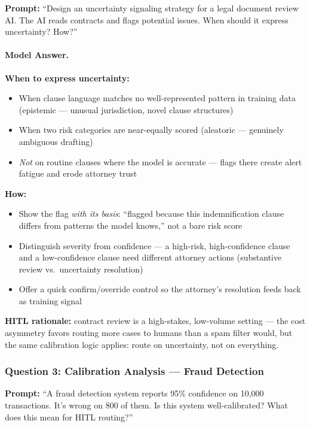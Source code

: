 \textbf{Prompt:} ``Design an uncertainty signaling strategy for a legal document review AI. The AI reads contracts and flags potential issues. When should it express uncertainty? How?''

\paragraph{Model Answer.}

\textbf{When to express uncertainty:}
\begin{itemize}
    \item When clause language matches no well-represented pattern in training data (epistemic --- unusual jurisdiction, novel clause structures)
    \item When two risk categories are near-equally scored (aleatoric --- genuinely ambiguous drafting)
    \item \emph{Not} on routine clauses where the model is accurate --- flags there create alert fatigue and erode attorney trust
\end{itemize}

\textbf{How:}
\begin{itemize}
    \item Show the flag \emph{with its basis}: ``flagged because this indemnification clause differs from patterns the model knows,'' not a bare risk score
    \item Distinguish severity from confidence --- a high-risk, high-confidence clause and a low-confidence clause need different attorney actions (substantive review vs.\ uncertainty resolution)
    \item Offer a quick confirm/override control so the attorney's resolution feeds back as training signal
\end{itemize}

\textbf{HITL rationale:} contract review is a high-stakes, low-volume setting --- the cost asymmetry favors routing more cases to humans than a spam filter would, but the same calibration logic applies: route on uncertainty, not on everything.

\subsubsection{Question 3: Calibration Analysis --- Fraud Detection}

\textbf{Prompt:} ``A fraud detection system reports 95\% confidence on 10,000 transactions. It's wrong on 800 of them. Is this system well-calibrated? What does this mean for HITL routing?''

